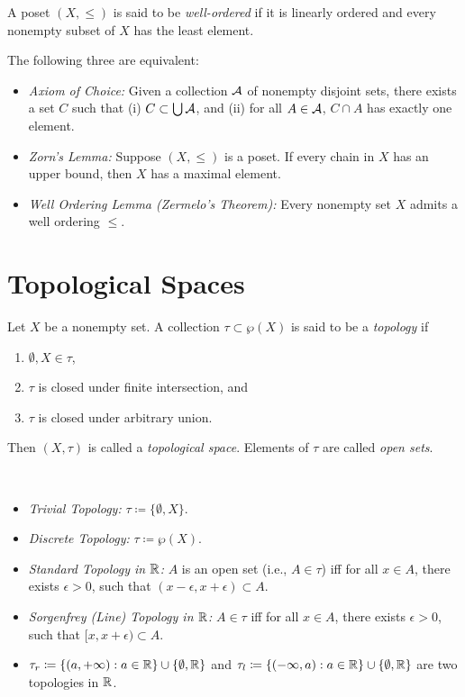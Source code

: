 \documentclass{techreport}
\begin{document}
\begin{definition}
	A poset $(X,{\le})$ is said to be \emph{well-ordered} if it is linearly ordered and every nonempty subset of $X$ has the least element.
\end{definition}

\begin{theorem}
	The following three are equivalent:
	\begin{itemize}
		\item \emph{Axiom of Choice:} Given a collection $\mathcal{A}$ of nonempty disjoint sets, there exists a set $C$ such that (i) $C \subset \bigcup \mathcal{A}$, and (ii) for all $A \in \mathcal{A}$, $C \cap A$ has exactly one element.
		\item \emph{Zorn's Lemma:} Suppose $(X,{\le})$ is a poset. If every chain in $X$ has an upper bound, then $X$ has a maximal element.
		\item \emph{Well Ordering Lemma (Zermelo's Theorem):} Every nonempty set $X$ admits a well ordering ${\le}$.
	\end{itemize}
\end{theorem}

\section{Topological Spaces}

\begin{definition}
	Let $X$ be a nonempty set.
	A collection $\tau \subset \wp(X)$ is said to be a \emph{topology} if
	\begin{enumerate}
		\item $\emptyset,X \in \tau$,
		\item $\tau$ is closed under finite intersection, and
		\item $\tau$ is closed under arbitrary union.
	\end{enumerate}
	Then $(X,\tau)$ is called a \emph{topological space}.
	Elements of $\tau$ are called \emph{open sets}.
\end{definition}

\begin{example}\
		\begin{itemize}
		\item \emph{Trivial Topology:} $\tau \coloneqq \{ \emptyset, X\}$.
		\item \emph{Discrete Topology:} $\tau \coloneqq \wp(X)$.
		\item \emph{Standard Topology in $\mathbb{R}$:} $A$ is an open set (i.e., $A \in \tau$) iff for all $x \in A$, there exists $\epsilon > 0$, such that $(x-\epsilon,x+\epsilon) \subset A$.
		\item \emph{Sorgenfrey (Line) Topology in $\mathbb{R}$:} $A \in \tau$ iff for all $x \in A$, there exists $\epsilon > 0$, such that $[x,x+\epsilon) \subset A$.
		\item $\tau_r \coloneqq \{ (a,+\infty) : a \in \mathbb{R} \} \cup \{ \emptyset,\mathbb{R} \}$ and $\tau_l \coloneqq \{ (-\infty,a) : a \in \mathbb{R} \} \cup \{ \emptyset,\mathbb{R}\}$ are two topologies in $\mathbb{R}$.
	\end{itemize}
\end{example}
\end{document}
